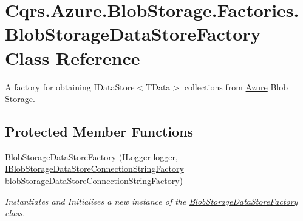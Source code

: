 \hypertarget{classCqrs_1_1Azure_1_1BlobStorage_1_1Factories_1_1BlobStorageDataStoreFactory}{}\section{Cqrs.\+Azure.\+Blob\+Storage.\+Factories.\+Blob\+Storage\+Data\+Store\+Factory Class Reference}
\label{classCqrs_1_1Azure_1_1BlobStorage_1_1Factories_1_1BlobStorageDataStoreFactory}


A factory for obtaining I\+Data\+Store$<$\+T\+Data$>$ collections from \hyperlink{namespaceCqrs_1_1Azure}{Azure} Blob \hyperlink{namespaceCqrs_1_1Azure_1_1Storage}{Storage}.  


\subsection*{Protected Member Functions}
\begin{DoxyCompactItemize}
\item 
\hyperlink{classCqrs_1_1Azure_1_1BlobStorage_1_1Factories_1_1BlobStorageDataStoreFactory_a448e77623db63d7a66fc6b6c75466eac_a448e77623db63d7a66fc6b6c75466eac}{Blob\+Storage\+Data\+Store\+Factory} (I\+Logger logger, \hyperlink{interfaceCqrs_1_1Azure_1_1BlobStorage_1_1DataStores_1_1IBlobStorageDataStoreConnectionStringFactory}{I\+Blob\+Storage\+Data\+Store\+Connection\+String\+Factory} blob\+Storage\+Data\+Store\+Connection\+String\+Factory)
\begin{DoxyCompactList}\small\item\em Instantiates and Initialises a new instance of the \hyperlink{classCqrs_1_1Azure_1_1BlobStorage_1_1Factories_1_1BlobStorageDataStoreFactory}{Blob\+Storage\+Data\+Store\+Factory} class. \end{DoxyCompactList}\end{DoxyCompactItemize}
